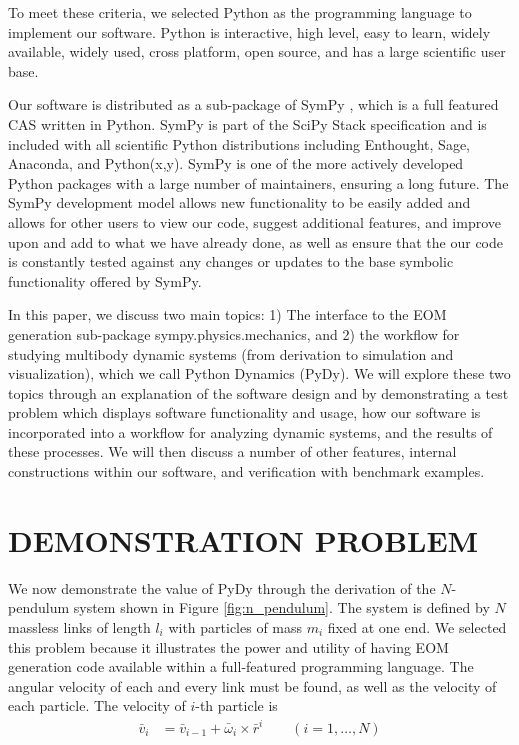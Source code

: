 \documentclass[twocolumn,10pt,final]{asme2e}
\begin{document}
To meet these criteria, we selected Python as the programming language to
implement our software. Python is interactive, high level, easy to learn,
widely available, widely used, cross platform, open source, and has a large
scientific user base.

Our software is distributed as a sub-package of SymPy \cite{sympy2012}, which
is a full featured CAS written in Python. SymPy is part of the SciPy Stack
\cite{SciPyStackGithub} specification and is included with all scientific
Python distributions including Enthought, Sage, Anaconda, and Python(x,y).
SymPy is one of the more actively developed Python packages with a large number
of maintainers, ensuring a long future. The SymPy development model allows new
functionality to be easily added and allows for other users to view our code,
suggest additional features, and improve upon and add to what we have already
done, as well as ensure that the our code is constantly tested against any
changes or updates to the base symbolic functionality offered by SymPy.

In this paper, we discuss two main topics: 1) The interface to the EOM
generation sub-package sympy.physics.mechanics, and 2) the workflow for
studying multibody dynamic systems (from derivation to simulation and
visualization), which we call Python Dynamics (PyDy). We will explore these two
topics through an explanation of the software design and by demonstrating a
test problem which displays software functionality and usage, how our software
is incorporated into a workflow for analyzing dynamic systems, and the results
of these processes. We will then discuss a number of other features, internal
constructions within our software, and verification with benchmark examples.

\section*{DEMONSTRATION PROBLEM}
We now demonstrate the value of PyDy through the derivation of the $N$-pendulum
system shown in Figure \ref{fig:n_pendulum}.  The system is defined by $N$
massless links of length $l_i$ with particles of mass $m_i$ fixed at one end.
We selected this problem because it illustrates the power and utility of having
EOM generation code available within a full-featured programming language. The
angular velocity of each and every link must be found, as well as the velocity
of each particle. The velocity of $i$-th particle is
\begin{align*}
  \bar{v}_i &= \bar{v}_{i-1} + \bar{\omega}_i \times
  \bar{r}^i \qquad (i = 1,\dots,N)
\end{align*}
\end{document}
